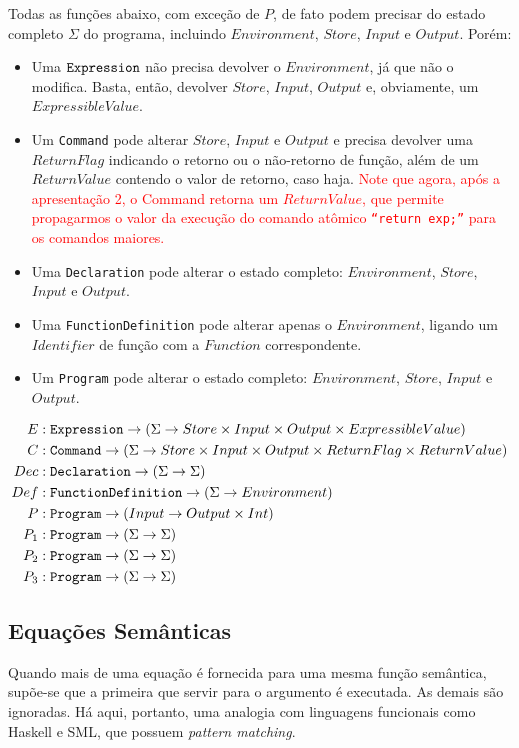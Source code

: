 \documentclass[12pt]{article}
\newcommand{\red}{\textcolor{red}}
\begin{document}
Todas as funções abaixo, com exceção de $P$, de fato podem precisar do estado completo $\Sigma$ do programa, incluindo $Environment$, $Store$, $Input$ e $Output$. Porém:
\begin{itemize}
\item Uma ${\tt Expression}$ não precisa devolver o $Environment$, já que não o modifica. Basta, então, devolver $Store$, $Input$,  $Output$ e, obviamente, um $ExpressibleValue$.
\item Um {\tt Command} pode alterar $Store$, $Input$ e $Output$ e precisa devolver uma $ReturnFlag$ indicando o retorno ou o não-retorno de função, além de um $ReturnValue$ contendo o valor de retorno, caso haja. \red{Note que agora, após a apresentação 2, o Command retorna um $ReturnValue$, que permite propagarmos o valor da execução do comando atômico \texttt{``return exp;''} para os comandos maiores. }
\item Uma {\tt Declaration} pode alterar o estado completo: $Environment$, $Store$, $Input$ e $Output$.
\item Uma {\tt FunctionDefinition} pode alterar apenas o $Environment$, ligando um $Identifier$ de função com a $Function$ correspondente.
\item Um {\tt Program} pode alterar o estado completo: $Environment$, $Store$, $Input$ e $Output$.
\end{itemize}
\begin{align*}
E   &:{\tt Expression} \rightarrow (\Sigma \rightarrow Store \times Input \times Output \times ExpressibleValue) \\
C   &:{\tt Command} \rightarrow (\Sigma \rightarrow Store \times Input \times Output\times ReturnFlag\times ReturnValue) \\
Dec &:{\tt Declaration} \rightarrow (\Sigma \rightarrow \Sigma) \\
Def &:{\tt FunctionDefinition} \rightarrow (\Sigma \rightarrow Environment) \\
P   &:{\tt Program} \rightarrow (Input \rightarrow Output\times Int) \\
P_1 &:{\tt Program} \rightarrow (\Sigma\rightarrow \Sigma) \\
P_2 &:{\tt Program} \rightarrow (\Sigma\rightarrow \Sigma) \\
P_3 &:{\tt Program} \rightarrow (\Sigma\rightarrow \Sigma) \\
\end{align*}

\subsection{Equações Semânticas}
Quando mais de uma equação é fornecida para uma mesma função semântica, supõe-se que a primeira que servir para o argumento é executada. As demais são ignoradas. Há aqui, portanto, uma analogia com linguagens funcionais como Haskell e SML, que possuem {\it pattern matching}.
\end{document}
